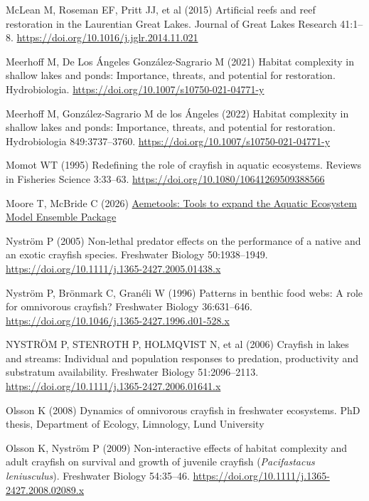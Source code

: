 \documentclass[
  12pt,
  a4paper,
]{scrbook}
\newlength{\cslhangindent}
\newenvironment{CSLReferences}[2] %
 {\begin{list}{}{%
  \setlength{\itemindent}{0pt}
  \setlength{\leftmargin}{0pt}
  \setlength{\parsep}{0pt}
  \ifodd #1
   \setlength{\leftmargin}{\cslhangindent}
   \setlength{\itemindent}{-1\cslhangindent}
  \fi
  \setlength{\itemsep}{#2\baselineskip}}}
 {\end{list}}
\begin{document}
\begin{CSLReferences}{1}{1}
McLean M, Roseman EF, Pritt JJ, et al (2015) Artificial reefs and reef
restoration in the {Laurentian Great Lakes}. Journal of Great Lakes
Research 41:1--8. \url{https://doi.org/10.1016/j.jglr.2014.11.021}

Meerhoff M, De Los Ángeles González-Sagrario M (2021) Habitat complexity
in shallow lakes and ponds: Importance, threats, and potential for
restoration. Hydrobiologia.
\url{https://doi.org/10.1007/s10750-021-04771-y}

Meerhoff M, González-Sagrario M de los Ángeles (2022) Habitat complexity
in shallow lakes and ponds: Importance, threats, and potential for
restoration. Hydrobiologia 849:3737--3760.
\url{https://doi.org/10.1007/s10750-021-04771-y}

Momot WT (1995) Redefining the role of crayfish in aquatic ecosystems.
Reviews in Fisheries Science 3:33--63.
\url{https://doi.org/10.1080/10641269509388566}

Moore T, McBride C (2026)
\href{https://limnotrack.com/aemetools/}{Aemetools: {Tools} to expand
the {Aquatic Ecosystem Model Ensemble Package}}

Nyström P (2005) Non‐lethal predator effects on the performance of a
native and an exotic crayfish species. Freshwater Biology 50:1938--1949.
\url{https://doi.org/10.1111/j.1365-2427.2005.01438.x}

Nyström P, Brönmark C, Granéli W (1996) Patterns in benthic food webs: A
role for omnivorous crayfish? Freshwater Biology 36:631--646.
\url{https://doi.org/10.1046/j.1365-2427.1996.d01-528.x}

NYSTRÖM P, STENROTH P, HOLMQVIST N, et al (2006) Crayfish in lakes and
streams: Individual and population responses to predation, productivity
and substratum availability. Freshwater Biology 51:2096--2113.
\url{https://doi.org/10.1111/j.1365-2427.2006.01641.x}

Olsson K (2008) Dynamics of omnivorous crayfish in freshwater
ecosystems. PhD thesis, Department of Ecology, Limnology, Lund
University

Olsson K, Nyström P (2009) Non-interactive effects of habitat complexity
and adult crayfish on survival and growth of juvenile crayfish
({\emph{Pacifastacus leniusculus}}). Freshwater Biology 54:35--46.
\url{https://doi.org/10.1111/j.1365-2427.2008.02089.x}


\end{CSLReferences}
\end{document}
